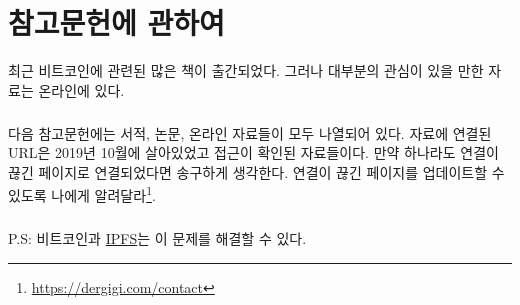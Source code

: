\chapter*{참고문헌에 관하여}

최근 비트코인에 관련된 많은 책이 출간되었다. 그러나 대부분의 관심이 있을 만한 자료는 온라인에 있다.

\paragraph{}
다음 참고문헌에는 서적, 논문, 온라인 자료들이 모두 나열되어 있다.
자료에 연결된 URL은 2019년 10월에 살아있었고 접근이 확인된 자료들이다. 
만약 하나라도 연결이 끊긴 페이지로 연결되었다면 송구하게 생각한다.
연결이 끊긴 페이지를 업데이트할 수 있도록 나에게 알려달라\footnote{\url{https://dergigi.com/contact}}.

\paragraph{}
P.S: 비트코인과 \href{https://ipfs.io/}{IPFS}는 이 문제를 해결할 수 있다.

